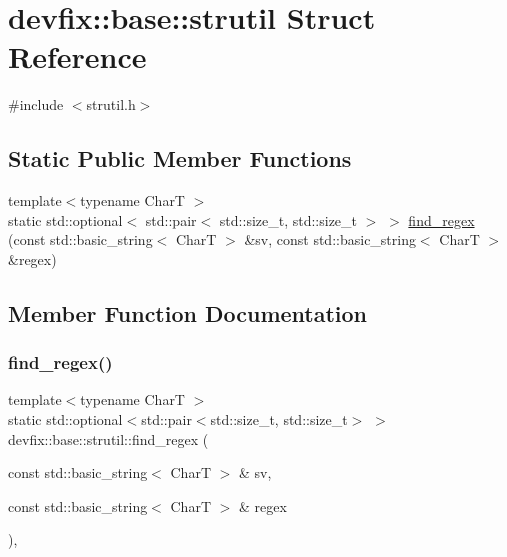 \hypertarget{structdevfix_1_1base_1_1strutil}{}\section{devfix\+:\+:base\+:\+:strutil Struct Reference}
\label{structdevfix_1_1base_1_1strutil}


{\ttfamily \#include $<$strutil.\+h$>$}

\subsection*{Static Public Member Functions}
\begin{DoxyCompactItemize}
\item 
{\footnotesize template$<$typename CharT $>$ }\\static std\+::optional$<$ std\+::pair$<$ std\+::size\+\_\+t, std\+::size\+\_\+t $>$ $>$ \hyperlink{structdevfix_1_1base_1_1strutil_abfee738c1d6577d38eddeaf3e652c50e}{find\+\_\+regex} (const std\+::basic\+\_\+string$<$ CharT $>$ \&sv, const std\+::basic\+\_\+string$<$ CharT $>$ \&regex)
\end{DoxyCompactItemize}


\subsection{Member Function Documentation}
\mbox{\label{structdevfix_1_1base_1_1strutil_abfee738c1d6577d38eddeaf3e652c50e}} 
\subsubsection{\texorpdfstring{find\+\_\+regex()}{find\_regex()}}
{\footnotesize\ttfamily template$<$typename CharT $>$ \\
static std\+::optional$<$std\+::pair$<$std\+::size\+\_\+t, std\+::size\+\_\+t$>$ $>$ devfix\+::base\+::strutil\+::find\+\_\+regex (\begin{DoxyParamCaption}\item[{const std\+::basic\+\_\+string$<$ CharT $>$ \&}]{sv,  }\item[{const std\+::basic\+\_\+string$<$ CharT $>$ \&}]{regex }\end{DoxyParamCaption})\hspace{0.3cm}{\ttfamily [inline]}, {\ttfamily [static]}}

